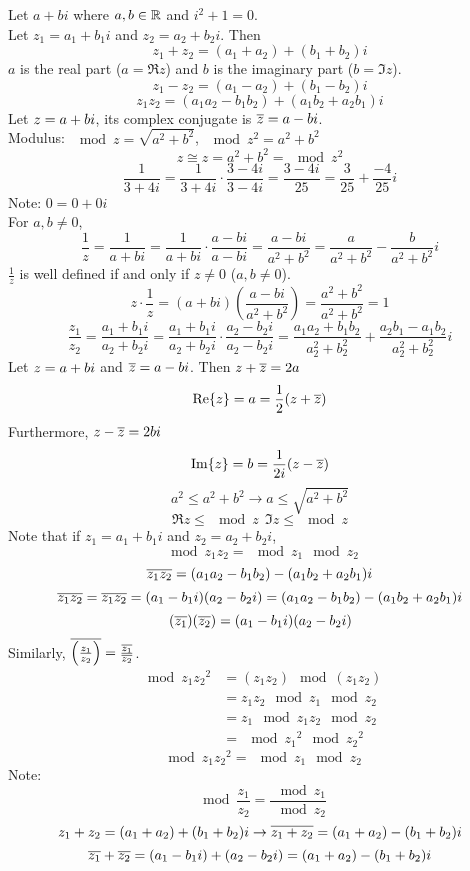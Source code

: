 \documentclass[12pt]{article}
\begin{document}
Let $a + bi$ where $a, b \in \mathbb{R}$ and $i^2 + 1 = 0$. \\
Let $z_1 = a_1 + b_1i$ and $z_2 = a_2 + b_2i$. Then 
$$ z_1 + z_2 = (a_1 + a_2) + (b_1 + b_2)i $$ 
$a$ is the real part ($a = \Re{z}$) and $b$ is the imaginary part ($b = \Im{z}$). 
$$z_1 - z_2 = (a_1 - a_2) + (b_1 - b_2)i $$ 
$$z_1z_2 = (a_1a_2 - b_1b_2) + (a_1b_2 + a_2b_1)i $$ 
Let $z = a + bi$, its complex conjugate is $\overline{z} = a - bi$. \\
Modulus: $\mod{z} = \sqrt{a^2 + b^2}$, $\mod{z}^2 = a^2 + b^2 $
$$ z\cong{z} = a^2 + b^2 = \mod{z}^2 $$ 
$$ \frac{1}{3 + 4i} = \frac{1}{3 + 4i} \cdot \frac{3-4i}{3-4i} = \frac{3-4i}{25} = \frac{3}{25} + \frac{-4}{25}i $$ 
Note: $0 = 0 + 0i$ \\
For $a,b \neq 0$, $$ \frac{1}{z} = \frac{1}{a + bi} = \frac{1}{a + bi} \cdot \frac{a - bi}{a-bi} = \frac{a-bi}{a^2 + b^2} = \frac{a}{a^2 + b^2} - \frac{b}{a^2 + b^2}i $$ 
$\frac{1}{z}$ is well defined if and only if $z \neq 0$ ($a,b \neq 0$). 
$$z \cdot \frac{1}{z} = (a + bi)(\frac{a - bi}{a^2 + b^2}) = \frac{a^2 + b^2}{a^2 + b^2} = 1 $$ 
$$ \frac{z_1}{z_2} = \frac{a_1 + b_1i}{a_2 + b_2i} = \frac{a_1 + b_1i}{a_2 + b_2i} \cdot \frac{a_2 - b_2i}{a_2 - b_2i} = \frac{a_1a_2 + b_1b_2}{a_2^2 + b_2^2} + \frac{a_2b_1 - a_1b_2}{a_2^2 + b_2^2}i  $$ 
Let $z = a + bi$ and $\overline{z} = a - bi$. Then $z + \overline{z} = 2a$
$$ \Re{z} = a = \frac{1}{2}(z + \overline{z})$$ 
Furthermore, $z - \overline{z} = 2bi$ $$ \Im{z} = b = \frac{1}{2i}(z - \overline{z})$$ 
$$a^2 \leq a^2 + b^2 \to a \leq \sqrt{a^2 + b^2} $$ 
$$\Re{z} \leq \mod{z} ~~ \Im{z} \leq \mod{z}$$ 
Note that if $z_1 = a_1 + b_1i$ and $z_2 = a_2 + b_2i$, $$\mod{z_1z_2} = \mod{z_1}\mod{z_2}$$ $$ \overline{z_1z_2} = (a_1a_2 - b_1b_2) - (a_1b_2 + a_2b_1)i $$ 
$$ \overline{z_1z_2} = \overline{z_1}\overline{z_2} = (a_1 - b_1i)(a_2 - b_2i) = (a_1a_2 - b_1b_2) - (a_1b_2 + a_2b_1)i $$ 
$$ (\overline{z_1})(\overline{z_2}) = (a_1 - b_1i)(a_2 - b_2i) $$ 
Similarly, $\overline{\Big( \frac{z_1}{z_2}\Big)} = \frac{\overline{z_1}}{\overline{z_2}}$. 
$$ \begin{aligned} \mod{z_1z_2}^2 &= (z_1z_2)\mod{(z_1z_2)}\\ &= z_1z_2\mod{z_1}\mod{z_2} \\ &= z_1\mod{z_1}z_2\mod{z_2} \\ &= \mod{z_1}^2\mod{z_2}^2 \end{aligned} $$ 
$$ \mod{z_1z_2}^2 = \mod{z_1}\mod{z_2}$$ 
Note: $$ \mod{\frac{z_1}{z_2}} = \frac{\mod{z_1}}{\mod{z_2}}$$ 
$$ z_1 + z_2 = (a_1 + a_2) + (b_1 + b_2)i \to \overline{z_1 + z_2} = (a_1 + a_2) - (b_1 + b_2)i $$ 
$$ \overline{z_1} + \overline{z_2} = (a_1 - b_1i) + (a_2 - b_2i) = (a_1 + a_2) - (b_1 + b_2)i $$
\end{document}
